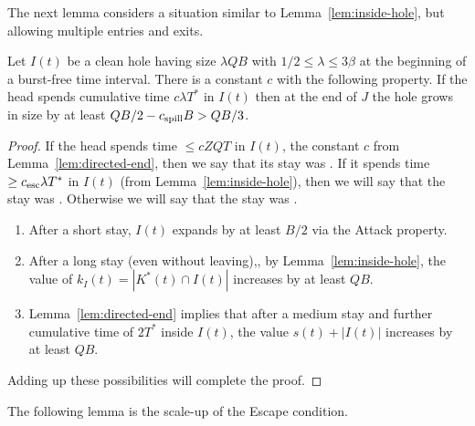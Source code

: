 \documentclass[11pt]{memoir}
\theoremstyle{definition} %
\renewcommand{\le}{\leq}
\renewcommand{\ge}{\geq}
\def\B{B}
\newcommand{\Q}{Q}
\newcommand{\Tu}{T}
\newcommand{\Tus}{T^{*}}
\newcommand{\Z}{Z}
\newcommand{\cns}[1]{c_{\textrm{\upshape #1}}}
\newcommand{\CEsc}{\cns{esc}}
\newcommand{\CSpill}{\cns{spill}}
\begin{document}
The next lemma considers a situation similar to Lemma~\ref{lem:inside-hole},
but allowing multiple entries and exits.

\begin{lemma}\label{lem:expand-hole}
  Let \( I(t) \) be a clean hole having size \( \lambda\Q\B \) with \(  1/2\le\lambda\le 3\beta \) at the
  beginning of a burst-free time interval.
  There is a constant \( c \) with the following property.
  If the head spends cumulative time \( c\lambda\Tus \) in \( I(t) \) then at the end of \( J \) the hole grows
  in size by at least \( \Q\B/2-\CSpill\B > \Q\B/3 \).
\end{lemma}
\begin{proof}
If the head spends time \( \le c\Z\Q\Tu \) in \( I(t) \), the constant \( c \)
from Lemma~\ref{lem:directed-end}, then we say that its stay was .
If it spends time \( \ge\CEsc\lambda\Tus \) in \( I(t) \) (from Lemma~\ref{lem:inside-hole}),
then we will say that the stay was .
Otherwise we will say that the stay was .
\begin{enumerate}

\item\label{i:fast-return} After a short stay, \( I(t) \) expands by at least \( \B/2 \) via the Attack property.

\item\label{i:long-time return}
  After a long stay (even without leaving),, by Lemma~\ref{lem:inside-hole}, the
  value of \( k_{I}(t)= |K^{*}(t)\cap I(t)| \) increases by at least \( \Q\B \).

\item\label{i:medium stay}
  Lemma~\ref{lem:directed-end} implies that after a medium stay and further cumulative time of \( 2\Tus \)
  inside \( I(t) \), the value \( s(t)+|I(t)| \) increases by at least \( \Q\B \).
  \end{enumerate}
    Adding up these possibilities will complete the proof.
\end{proof}

The following lemma is the scale-up of the Escape condition.
\end{document}
